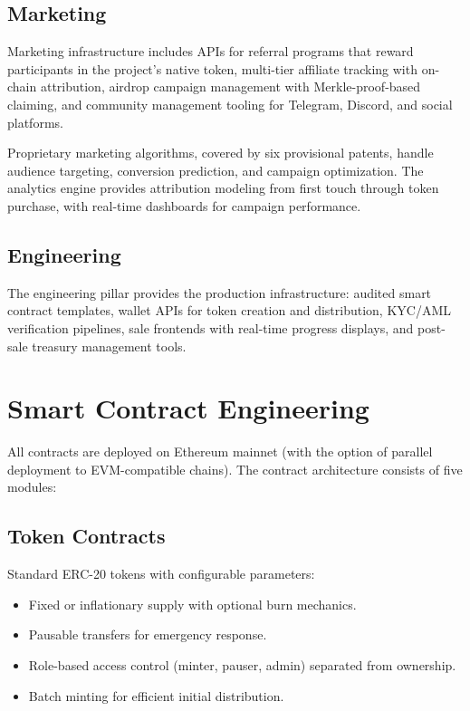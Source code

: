 \documentclass[11pt,letterpaper]{article}
\begin{document}
\subsection{Marketing}

Marketing infrastructure includes APIs for referral programs that reward
participants in the project's native token, multi-tier affiliate tracking with
on-chain attribution, airdrop campaign management with Merkle-proof-based
claiming, and community management tooling for Telegram, Discord, and social
platforms.

Proprietary marketing algorithms, covered by six provisional patents, handle
audience targeting, conversion prediction, and campaign optimization. The
analytics engine provides attribution modeling from first touch through token
purchase, with real-time dashboards for campaign performance.

\subsection{Engineering}

The engineering pillar provides the production infrastructure: audited smart
contract templates, wallet APIs for token creation and distribution, KYC/AML
verification pipelines, sale frontends with real-time progress displays, and
post-sale treasury management tools.

\section{Smart Contract Engineering}
\label{sec:contracts}

All contracts are deployed on Ethereum mainnet (with the option of parallel
deployment to EVM-compatible chains). The contract architecture consists of five
modules:

\subsection{Token Contracts}

Standard ERC-20 tokens with configurable parameters:

\begin{itemize}[leftmargin=1.2em]
    \item Fixed or inflationary supply with optional burn mechanics.
    \item Pausable transfers for emergency response.
    \item Role-based access control (minter, pauser, admin) separated from
    ownership.
    \item Batch minting for efficient initial distribution.
\end{itemize}
\end{document}

